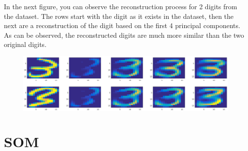 \documentclass[11pt, a4paper]{article}
\begin{document}
In the next figure, you can observe the reconstruction process for 2
digits from the dataset. The rows start with the digit as it exists in
the dataset, then the next are a reconstruction of the digit based on
the first 4 principal components. As can be observed, the
reconstructed digits are much more similar than the two original
digits.

\begin{figure}[H]
    \centering
    \includegraphics[scale=.20]{unsupervised_reconstructions.png}
    \label{fig:reconstructions}
\end{figure}

\section{SOM}

%  
% 
\end{document}
